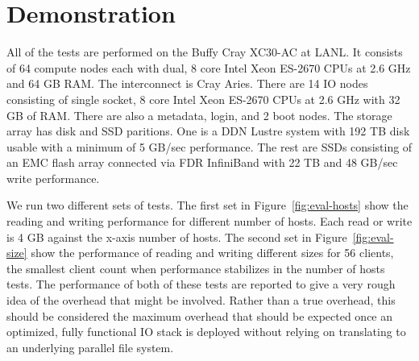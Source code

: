 \documentclass{sig-alt-gov2}
\begin{document}
%
%

\section{Demonstration}
\label{sec:evaluation}


All of the tests are performed on the Buffy Cray XC30-AC at LANL.  It consists
of 64 compute nodes each with dual, 8 core Intel Xeon ES-2670 CPUs at 2.6 GHz
and 64 GB RAM.  The interconnect is Cray Aries. There are 14 IO nodes
consisting of single socket, 8 core Intel Xeon ES-2670 CPUs at 2.6 GHz with 32
GB of RAM.  There are also a metadata, login, and 2 boot nodes.  The storage
array has disk and SSD paritions. One is a DDN Lustre system with 192 TB disk
usable with a minimum of 5 GB/sec performance. The rest are SSDs consisting of
an EMC flash array connected via FDR InfiniBand with 22 TB and 48 GB/sec write
performance.

We run two different sets of tests. The first set in
Figure~\ref{fig:eval-hosts} show the reading and writing performance for
different number of hosts. Each read or write is 4 GB against the x-axis number
of hosts. The second set in Figure~\ref{fig:eval-size} show the performance of
reading and writing different sizes for 56 clients, the smallest client count
when performance stabilizes in the number of hosts tests.  The performance of
both of these tests are reported to give a very rough idea of the overhead that
might be involved. Rather than a true overhead, this should be considered the
maximum overhead that should be expected once an optimized, fully functional IO
stack is deployed without relying on translating to an underlying parallel file
system. 
\end{document}
